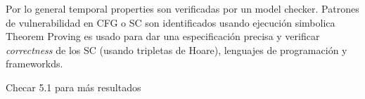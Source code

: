 Por lo general temporal properties son verificadas
por un model checker. Patrones de vulnerabilidad
en CFG o SC
son identificados usando ejecución simbolica
Theorem Proving es usado para dar una especificación
precisa y verificar {\it correctness} de los SC
(usando tripletas de Hoare), lenguajes de programación
y frameworkds. 

Checar 5.1 para más resultados



